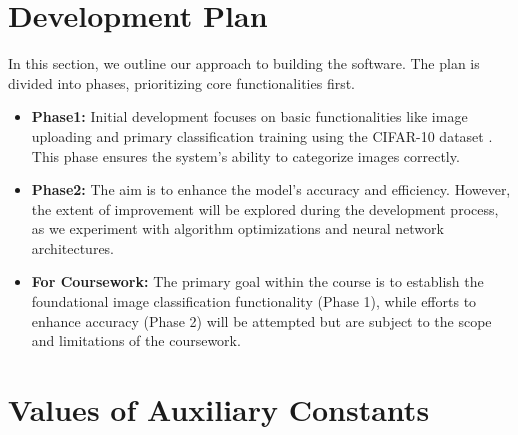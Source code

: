 \documentclass[12pt]{article}
\begin{document}
\section{Development Plan}

In this section, we outline our approach to building the software. 
The plan is divided into phases, prioritizing core functionalities first.

\begin{itemize}
  \item \textbf{Phase1:} Initial development focuses on basic functionalities like image 
  uploading and primary classification training using the CIFAR-10 dataset \cite{CIFAR}. 
  This phase ensures the system's ability to categorize images correctly.

  \item \textbf{Phase2:} The aim is to enhance the model's accuracy and efficiency. 
  However, the extent of improvement will be explored during the development process, 
  as we experiment with algorithm optimizations and neural network architectures.

  \item \textbf{For Coursework:} The primary goal within the course is to establish the 
  foundational image classification functionality (Phase 1), while efforts to enhance 
  accuracy (Phase 2) will be attempted but are subject to the scope and limitations 
  of the coursework.
\end{itemize}

\section{Values of Auxiliary Constants}


\end{document}
